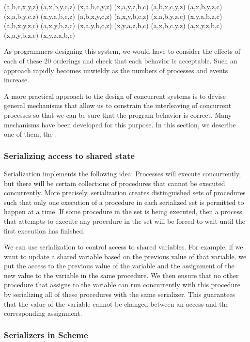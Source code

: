 \begin{example}
(a,b,c,x,y,z)  (a,x,b,y,c,z)  (x,a,b,c,y,z)  (x,a,y,z,b,c)
(a,b,x,c,y,z)  (a,x,b,y,z,c)  (x,a,b,y,c,z)  (x,y,a,b,c,z)
(a,b,x,y,c,z)  (a,x,y,b,c,z)  (x,a,b,y,z,c)  (x,y,a,b,z,c)
(a,b,x,y,z,c)  (a,x,y,b,z,c)  (x,a,y,b,c,z)  (x,y,a,z,b,c)
(a,x,b,c,y,z)  (a,x,y,z,b,c)  (x,a,y,b,z,c)  (x,y,z,a,b,c)
\end{example}

\noindent
As programmers designing this system, we would have to consider the effects of
each of these 20 orderings and check that each behavior is acceptable.  Such an
approach rapidly becomes unwieldy as the numbers of processes and events
increase.

A more practical approach to the design of concurrent systems is to devise
general mechanisms that allow us to constrain the interleaving of concurrent
processes so that we can be sure that the program behavior is correct.  Many
mechanisms have been developed for this purpose.  In this section, we describe
one of them, the .

\subsubsection*{Serializing access to shared state}

Serialization implements the following idea: Processes will execute
concurrently, but there will be certain collections of procedures that cannot
be executed concurrently.  More precisely, serialization creates distinguished
sets of procedures such that only one execution of a procedure in each
serialized set is permitted to happen at a time.  If some procedure in the set
is being executed, then a process that attempts to execute any procedure in the
set will be forced to wait until the first execution has finished.

We can use serialization to control access to shared variables.  For example,
if we want to update a shared variable based on the previous value of that
variable, we put the access to the previous value of the variable and the
assignment of the new value to the variable in the same procedure.  We then
ensure that no other procedure that assigns to the variable can run
concurrently with this procedure by serializing all of these procedures with
the same serializer.  This guarantees that the value of the variable cannot be
changed between an access and the corresponding assignment.

\subsubsection*{Serializers in Scheme}

